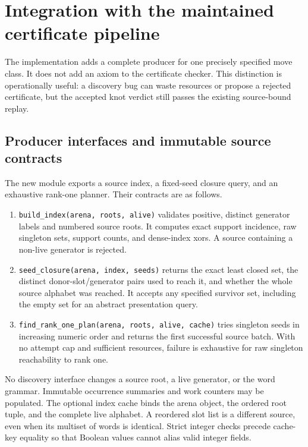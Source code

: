 \section{Integration with the maintained certificate pipeline}
\label{sec:integration}

The implementation adds a complete producer for one precisely specified
move class. It does not add an axiom to the certificate checker. This
distinction is operationally useful: a discovery bug can waste resources
or propose a rejected certificate, but the accepted knot verdict still
passes the existing source-bound replay.

\subsection{Producer interfaces and immutable source contracts}

The new module  exports a source index,
a fixed-seed closure query, and an exhaustive rank-one planner. Their
contracts are as follows.
\begin{enumerate}
\item \texttt{build\_index(arena, roots, alive)} validates positive,
  distinct generator labels and numbered source roots. It computes exact
  support incidence, raw singleton sets, support counts, and dense-index
  xors. A source containing a non-live generator is rejected.
\item \texttt{seed\_closure(arena, index, seeds)} returns the exact least
  closed set, the distinct donor-slot/generator pairs used to reach it,
  and whether the whole source alphabet was reached. It accepts any
  specified survivor set, including the empty set for an abstract
  presentation query.
\item \texttt{find\_rank\_one\_plan(arena, roots, alive, cache)} tries
  singleton seeds in increasing numeric order and returns the first
  successful source batch. With no attempt cap and sufficient resources,
  failure is exhaustive for raw singleton reachability to rank one.
\end{enumerate}
No discovery interface changes a source root, a live generator, or the
word grammar. Immutable occurrence summaries and work counters may be
populated. The optional index cache binds the arena object, the ordered
root tuple, and the complete live alphabet. A reordered slot list is a
different source, even when its multiset of words is identical. Strict
integer checks precede cache-key equality so that Boolean values cannot
alias valid integer fields.

